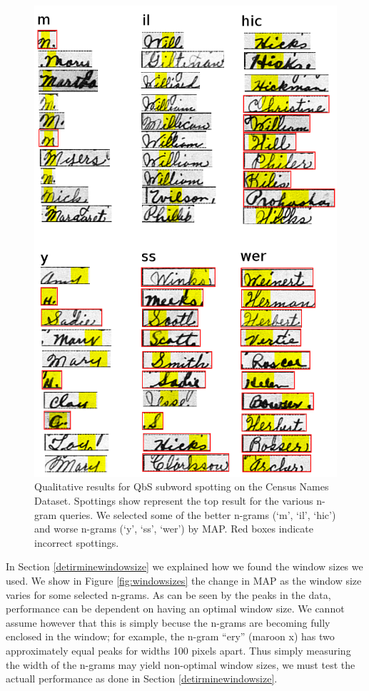 \documentclass[ms,electronic,twosidetoc,letterpaper,chaptercenter,parttop,lol,lof,lot]{byumsphd}
\begin{document}
\begin{figure}
    \centering
    \includegraphics[width=.6\textwidth]{qualSpotNames}
    \caption{Qualitative results for QbS subword spotting on the Census Names Dataset. Spottings show represent the top result for the various n-gram queries. We selected some of the better n-grams (`m', `il', `hic') and worse n-grams (`y', `ss', `wer') by MAP. Red boxes indicate incorrect spottings.
    }
    \label{fig:qualSpotNames}
\end{figure}

In Section \ref{detirminewindowsize} we explained how we found the window sizes we used. We show in Figure \ref{fig:windowsizes} the change in MAP as the window size varies for some selected n-grams. As can be seen by the peaks in the data, performance can be dependent on having an optimal window size. We cannot assume however that this is simply becuse the n-grams are becoming fully enclosed in the window; for example, the n-gram ``ery'' (maroon x) has two approximately equal peaks for widths 100 pixels apart. Thus simply measuring the width of the n-grams may yield non-optimal window sizes, we must test the actuall performance as done in Section \ref{detirminewindowsize}.
\end{document}
